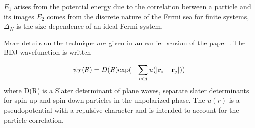 \documentclass{article}
\def\r{{\bf r}}
\begin{document}
$E_{1}$ arises from the potential energy due to the correlation between a particle and its images
$E_{2}$ comes from the discrete nature of the Fermi sea for finite systems, $\Delta_{N}$ is the 
size dependence of an ideal Fermi system.

More details on the technique are given in an earlier version of the paper
\cite{ceperley78}. The BDJ wavefunction is written

\begin{equation}
\psi_{T}(R) = D(R) {\rm exp}(-\sum_{i<j} u(|\r_{i}-\r_{j}|))
\end{equation}
%
where D(R) is a Slater determinant of plane waves, separate slater determinants for
spin-up and spin-down particles in the unpolarized phase. The $u(r)$ is a pseudopotential
with a repulsive character and is intended to account for the particle correlation. 

\scriptsize


\end{document}
